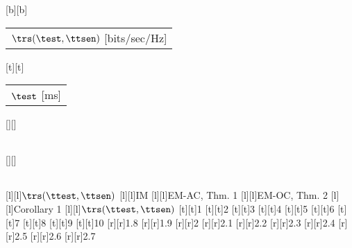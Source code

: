 %    
%
%
%
[b][b]{\fontsize{8}{12}\selectfont \color[rgb]{0,0,0}\setlength{\tabcolsep}{0pt}\begin{tabular}{c}$\trs(\test,\ttsen)$ [bits/sec/Hz]\end{tabular}}%
[t][t]{\fontsize{8}{12}\selectfont \color[rgb]{0,0,0}\setlength{\tabcolsep}{0pt}\begin{tabular}{c}$\test$ [ms]\end{tabular}}%
[][]{\fontsize{10}{15}\selectfont \color[rgb]{0,0,0}\setlength{\tabcolsep}{0pt}\begin{tabular}{c} \end{tabular}}%
[][]{\fontsize{10}{15}\selectfont \color[rgb]{0,0,0}\setlength{\tabcolsep}{0pt}\begin{tabular}{c} \end{tabular}}%
[l][l]{\fontsize{8}{12}\selectfont \color[rgb]{0,0,0}$\trs(\ttest,\ttsen)$}%
[l][l]{\fontsize{8}{12}\selectfont \color[rgb]{0,0,0}IM}%
[l][l]{\fontsize{8}{12}\selectfont \color[rgb]{0,0,0}EM-AC, Thm. 1}%
[l][l]{\fontsize{8}{12}\selectfont \color[rgb]{0,0,0}EM-OC, Thm. 2}%
[l][l]{\fontsize{8}{12}\selectfont \color[rgb]{0,0,0}Corollary 1}%
[l][l]{\fontsize{8}{12}\selectfont \color[rgb]{0,0,0}$\trs(\ttest,\ttsen)$}%
%
\fontsize{8}{12}%
\selectfont%
%
[t][t]{1}%
[t][t]{2}%
[t][t]{3}%
[t][t]{4}%
[t][t]{5}%
[t][t]{6}%
[t][t]{7}%
[t][t]{8}%
[t][t]{9}%
[t][t]{10}%
%
[r][r]{1.8}%
[r][r]{1.9}%
[r][r]{2}%
[r][r]{2.1}%
[r][r]{2.2}%
[r][r]{2.3}%
[r][r]{2.4}%
[r][r]{2.5}%
[r][r]{2.6}%
[r][r]{2.7}%
%
%
